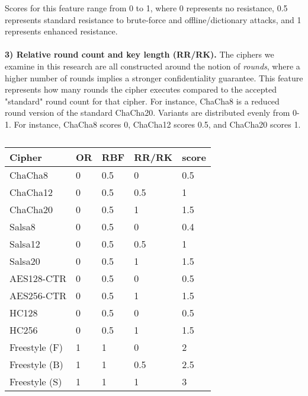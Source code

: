 Scores for this feature range from 0 to 1, where 0 represents no resistance,
0.5 represents standard resistance to brute-force and offline/dictionary
attacks, and 1 represents enhanced resistance.\\
\\
\textbf{3) Relative round count and key length (RR/RK).} The ciphers we examine
in this research are all constructed around the notion of \emph{rounds}, where a
higher number of rounds implies a stronger confidentiality guarantee. This
feature represents how many rounds the cipher executes compared to the accepted
"standard" round count for that cipher. For instance, ChaCha8 is a reduced round
version of the standard ChaCha20. Variants are distributed evenly from 0-1. For
instance, ChaCha8 scores 0, ChaCha12 scores 0.5, and ChaCha20 scores 1\@.

\begin{table}[]
  \begin{tabular}{@{}lllll@{}}
  \toprule
  \textbf{Cipher} & \textbf{OR} & \textbf{RBF} & \textbf{RR/RK} & \textbf{score} \\ \midrule
  ChaCha8     & 0      & 0.5     & 0       & 0.5      \\
  ChaCha12    & 0      & 0.5     & 0.5      & 1       \\
  ChaCha20    & 0      & 0.5     & 1       & 1.5      \\
  Salsa8     & 0      & 0.5     & 0       & 0.4      \\
  Salsa12     & 0      & 0.5     & 0.5      & 1      \\
  Salsa20     & 0      & 0.5     & 1       & 1.5      \\
  AES128-CTR   & 0      & 0.5     & 0       & 0.5      \\
  AES256-CTR   & 0      & 0.5     & 1       & 1.5      \\
  HC128      & 0      & 0.5     & 0       & 0.5      \\
  HC256      & 0      & 0.5     & 1       & 1.5      \\
  Freestyle (F)  & 1      & 1      & 0       & 2       \\
  Freestyle (B)  & 1      & 1      & 0.5      & 2.5      \\
  Freestyle (S)  & 1      & 1      & 1       & 3
  \end{tabular}
  \caption{}
  \label{tbl:security-quant}
\end{table}
